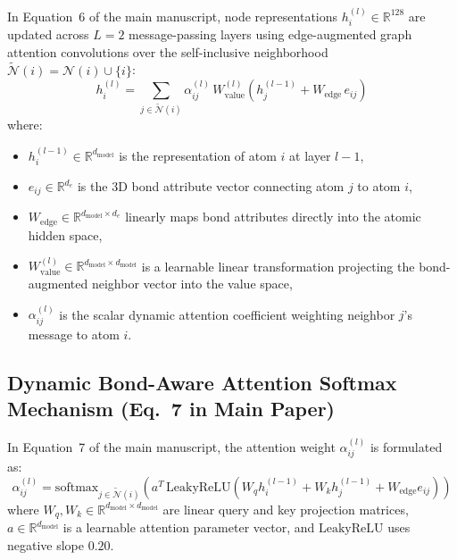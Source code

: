 \documentclass[11pt]{article}
\begin{document}
In Equation~6 of the main manuscript, node representations $h_i^{(l)} \in \mathbb{R}^{128}$ are updated across $L = 2$ message-passing layers using edge-augmented graph attention convolutions over the self-inclusive neighborhood $\widetilde{\mathcal{N}}(i) = \mathcal{N}(i) \cup \{i\}$:
\begin{equation}
h_i^{(l)} = \sum_{j \in \widetilde{\mathcal{N}}(i)} \alpha_{ij}^{(l)} \, W_{\mathrm{value}}^{(l)} \left( h_j^{(l-1)} + W_{\mathrm{edge}} \, e_{ij} \right)
\label{eq:s_gat_update}
\end{equation}
where:
\begin{itemize}[leftmargin=1.0cm]
    \item $h_i^{(l-1)} \in \mathbb{R}^{d_{\mathrm{model}}}$ is the representation of atom $i$ at layer $l-1$,
    \item $e_{ij} \in \mathbb{R}^{d_e}$ is the 3D bond attribute vector connecting atom $j$ to atom $i$,
    \item $W_{\mathrm{edge}} \in \mathbb{R}^{d_{\mathrm{model}} \times d_e}$ linearly maps bond attributes directly into the atomic hidden space,
    \item $W_{\mathrm{value}}^{(l)} \in \mathbb{R}^{d_{\mathrm{model}} \times d_{\mathrm{model}}}$ is a learnable linear transformation projecting the bond-augmented neighbor vector into the value space,
    \item $\alpha_{ij}^{(l)}$ is the scalar dynamic attention coefficient weighting neighbor $j$'s message to atom $i$.
\end{itemize}

\subsection{Dynamic Bond-Aware Attention Softmax Mechanism (Eq.~7 in Main Paper)}
\label{sec:gat_attn_derivation}

In Equation~7 of the main manuscript, the attention weight $\alpha_{ij}^{(l)}$ is formulated as:
\begin{equation}
\alpha_{ij}^{(l)} = \mathrm{softmax}_{j \in \widetilde{\mathcal{N}}(i)} \left( a^{T} \, \mathrm{LeakyReLU} \left( W_{q} h_i^{(l-1)} + W_{k} h_j^{(l-1)} + W_{\mathrm{edge}} e_{ij} \right) \right)
\label{eq:s_gat_attn}
\end{equation}
where $W_q, W_k \in \mathbb{R}^{d_{\mathrm{model}} \times d_{\mathrm{model}}}$ are linear query and key projection matrices, $a \in \mathbb{R}^{d_{\mathrm{model}}}$ is a learnable attention parameter vector, and $\mathrm{LeakyReLU}$ uses negative slope $0.20$.
\end{document}
